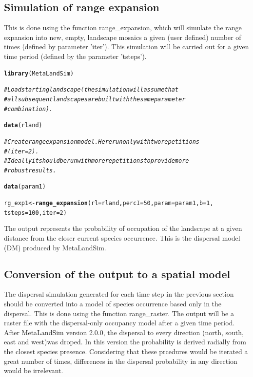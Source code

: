 \documentclass{article}\usepackage[]{graphicx}\usepackage[]{xcolor}
\makeatletter
\newcommand{\hlnum}[1]{\textcolor[rgb]{0.686,0.059,0.569}{#1}}%
\newcommand{\hlcom}[1]{\textcolor[rgb]{0.678,0.584,0.686}{\textit{#1}}}%
\newcommand{\hldef}[1]{\textcolor[rgb]{0.345,0.345,0.345}{#1}}%
\newcommand{\hlkwb}[1]{\textcolor[rgb]{0.69,0.353,0.396}{#1}}%
\newcommand{\hlkwc}[1]{\textcolor[rgb]{0.333,0.667,0.333}{#1}}%
\newcommand{\hlkwd}[1]{\textcolor[rgb]{0.737,0.353,0.396}{\textbf{#1}}}%
\newenvironment{kframe}{%
 \def\at@end@of@kframe{}%
 \ifinner\ifhmode%
  \def\at@end@of@kframe{\end{minipage}}%
  \begin{minipage}{\columnwidth}%
 \fi\fi%
 \def\FrameCommand##1{\hskip\@totalleftmargin \hskip-\fboxsep
 \colorbox{shadecolor}{##1}\hskip-\fboxsep
     \hskip-\linewidth \hskip-\@totalleftmargin \hskip\columnwidth}%
 \MakeFramed {\advance\hsize-\width
   \@totalleftmargin\z@ \linewidth\hsize
   \@setminipage}}%
 {\par\unskip\endMakeFramed%
 \at@end@of@kframe}
\newenvironment{knitrout}{}{} %
\makeatother
\begin{document}
\subsection{Simulation of range expansion}
This is done using the function range\_expansion, which will simulate the range expansion into new, empty, landscape mosaics a given (user defined) number of times (defined by parameter 'iter'). This simulation will be carried out for a given time period (defined by the parameter 'tsteps').

\begin{knitrout}
\color{fgcolor}\begin{kframe}
\begin{alltt}
\hlkwd{library}\hldef{(MetaLandSim)}

\hlcom{#Load starting landscape (the simulation will assume that }
\hlcom{#all subsequent landscapes are built with the same parameter }
\hlcom{#combination).}

\hlkwd{data}\hldef{(rland)}

\hlcom{#Create range expansion model. Here run only with two repetitions }
\hlcom{#(iter=2). }
\hlcom{#Ideally it should be run with more repetitions to provide more }
\hlcom{#robust results.}

\hlkwd{data}\hldef{(param1)}

\hldef{rg_exp1} \hlkwb{<-} \hlkwd{range_expansion}\hldef{(}\hlkwc{rl}\hldef{=rland,} \hlkwc{percI}\hldef{=}\hlnum{50}\hldef{,}  \hlkwc{param}\hldef{=param1,}\hlkwc{b}\hldef{=}\hlnum{1}\hldef{,}
\hlkwc{tsteps}\hldef{=}\hlnum{100}\hldef{,} \hlkwc{iter}\hldef{=}\hlnum{2}\hldef{)}
\end{alltt}
\end{kframe}
\end{knitrout}

The output represents the probability of occupation of the landscape at a given distance from the closer current species occurrence. This is the dispersal model (DM) produced by MetaLandSim.

\subsection{Conversion of the output to a spatial model}
The dispersal simulation generated for each time step in the previous section should be converted into a model of species occurrence based only in the dispersal. This is done using the function range\_raster. The output will be a raster file with the dispersal-only occupancy model after a given time period. 
After MetaLandSim version 2.0.0, the dispersal to every direction (north, south, east and west)was droped. In this version the probability is derived radially from the closest species presence. Considering that these prcedures would be iterated a great number of times, differences in the dispersal probability in any direction would be irrelevant. 
\end{document}
